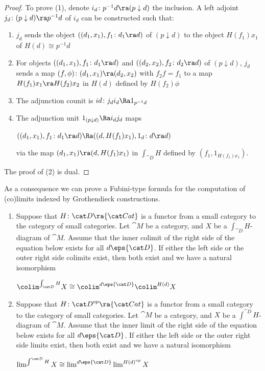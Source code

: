 \begin{proof}
To prove (1), denote $i_d \colon p^{-1}d \ra (p \downarrow d)$ the inclusion. A left adjoint $j_d \colon (p \downarrow d) \ra p^{-1}d$ of $i_d$ can be constructed such that:
\begin{enumerate}
\item[(a)]
$j_d$ sends the object $((d_1, x_1), f_1 \colon d_1 \ra d)$ of $(p \downarrow d)$ to the object $H(f_1)x_1$ of $H(d) \cong p^{-1}d$
\item[(b)]
For objects $((d_1, x_1), f_1 \colon d_1 \ra d)$ and $((d_2, x_2), f_2 \colon d_2 \ra d)$ of $(p \downarrow d)$, $j_d$ sends a map $(f, \phi) \colon (d_1, x_1) \ra (d_2, x_2)$ with $f_2f = f_1$ to a map $H(f_1)x_1 \ra H(f_2)x_2$ in $H(d)$ defined by $H(f_2)\phi$
\item[(c)]
The adjunction counit is $id \colon j_di_d \Ra 1_{p^{-1}d}$
\item[(d)]
The adjunction unit $1_{(p \downarrow d)} \Ra i_dj_d$ maps 
\begin{center}
$((d_1, x_1), f_1 \colon d_1 \ra d) \Ra ((d, H(f_1)x_1), 1_d \colon d \ra d)$
\end{center}
via the map $(d_1, x_1) \ra (d, H(f_1)x_1)$ in $\int_{\cat D} H$ defined by $(f_1, 1_{H(f_1)x_1})$.
\end{enumerate}
The proof of (2) is dual.
\end{proof}

As a consequence we can prove a Fubini-type formula for the computation of (co)limits indexed by Grothendieck constructions.

\begin{prop}
\label{prop:grothendieckconstrcolims}
\mbox{}
\begin{enumerate}
\item
Suppose that $H \colon {\cat D} \ra {\cat Cat}$ is a functor from a small category to the category of small categories. Let ${\cat M}$ be a category, and $X$ be a $\int_{\cat D} H$-diagram of ${\cat M}$. Assume that the inner colimit of the right side of the equation below exists for all $d \eps {\cat D}$. If either the left side or the outer right side colimits exist, then both exist and we have a natural isomorphism
\begin{center}
$\colim^{\int_{\cat D} H}X \cong \colim^{d \eps {\cat D}} \colim^{H(d)} X$
\end{center}
\item
Suppose that $H \colon {\cat D}^{op} \ra {\cat Cat}$ is a functor from a small category to the category of small categories. Let ${\cat M}$ be a category, and $X$ be a $\int^{\cat D} H$-diagram of ${\cat M}$. Assume that the inner limit of the right side of the equation below exists for all $d \eps {\cat D}$. If either the left side or the outer right side limits exist, then both exist and we have a natural isomorphism
\begin{center}
$\lim^{\int^{\cat D} H}X \cong \lim^{d \eps {\cat D}} \lim^{H(d)^{op}} X$
\end{center}
\end{enumerate}
\end{prop}


